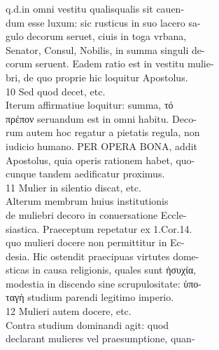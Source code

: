 \documentclass{article}
\begin{document}
\begin{pages}
                q.d.in omni vestitu qualisqualis sit cauen- \\
                dum esse luxum: sic rusticus in suo lacero sa- \\
                gulo decorum seruet, ciuis in toga vrbana, \\
                Senator, Consul, Nobilis, in summa singuli de- \\
                corum seruent. Eadem ratio est in vestitu mulie- \\
                bri, de quo proprie hic loquitur Apostolus. \\
                10 Sed quod decet, etc. \\
                Iterum affirmatiue loquitur: summa, τό \\
                πρέπον seruandum est in omni habitu. Deco- \\
                rum autem hoc regatur a pietatis regula, non \\
                iudicio humano. PER OPERA BONA, addit \\
                Apostolus, quia operis rationem habet, quo- \\
                cunque tandem aedificatur proximus. \\
                11 Mulier in silentio discat, etc. \\
                Alterum membrum huius institutionis \\
                de muliebri decoro in conuersatione Eccle- \\
                siastica. Praeceptum repetatur ex 1.Cor.14. \\
                quo mulieri docere non permittitur in Ec- \\
                desia. Hic ostendit praecipuas virtutes dome- \\
                sticas in causa religionis, quales sunt ἡσυχία, \\
                modestia in discendo sine scrupulositate: ὑπο- \\
                ταγὴ studium parendi legitimo imperio. \\
                12 Mulieri autem docere, etc. \\
                Contra studium dominandi agit: quod \\
                declarant mulieres vel praesumptione, quan- \\

\end{pages}
\end{document}
